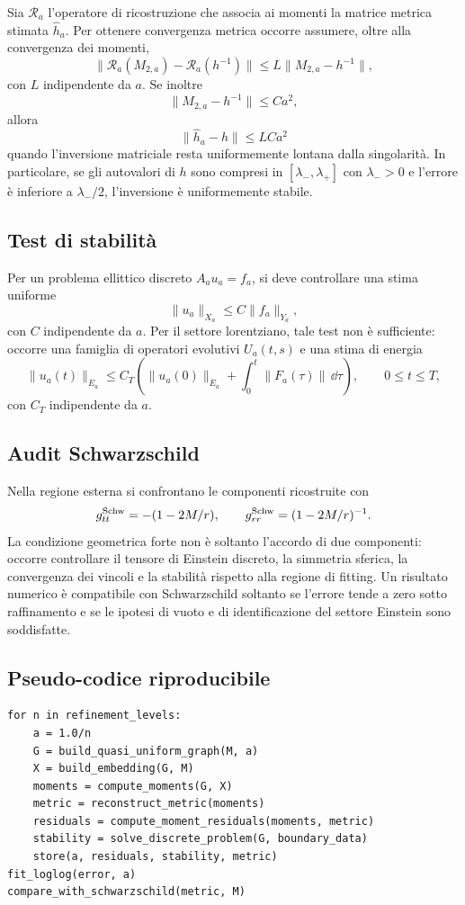 Sia $\mathcal R_a$ l'operatore di ricostruzione che associa ai momenti
la matrice metrica stimata $\widehat h_a$. Per ottenere convergenza
metrica occorre assumere, oltre alla convergenza dei momenti,
\[
\|\mathcal R_a(M_{2,a})-\mathcal R_a(h^{-1})\|
\leq L\|M_{2,a}-h^{-1}\|,
\]
con $L$ indipendente da $a$. Se inoltre
\[
\|M_{2,a}-h^{-1}\|\leq Ca^2,
\]
allora
\[
\|\widehat h_a-h\|\leq LCa^2
\]
quando l'inversione matriciale resta uniformemente lontana dalla
singolarità. In particolare, se gli autovalori di $h$ sono compresi in
$[\lambda_-,\lambda_+]$ con $\lambda_->0$ e l'errore è inferiore a
$\lambda_-/2$, l'inversione è uniformemente stabile.

\subsection{Test di stabilità}

Per un problema ellittico discreto $A_au_a=f_a$, si deve controllare
una stima uniforme
\[
\|u_a\|_{X_a}\leq C\|f_a\|_{Y_a},
\]
con $C$ indipendente da $a$. Per il settore lorentziano, tale test
non è sufficiente: occorre una famiglia di operatori evolutivi
$U_a(t,s)$ e una stima di energia
\[
\|u_a(t)\|_{E_a}\leq C_T\left(\|u_a(0)\|_{E_a}
+\int_0^t\|F_a(\tau)\|\,\dd\tau\right),
\qquad 0\leq t\leq T,
\]
con $C_T$ indipendente da $a$.

\subsection{Audit Schwarzschild}

Nella regione esterna si confrontano le componenti ricostruite con
\[
g_{tt}^{\rm Schw}=-(1-2M/r),
\qquad
g_{rr}^{\rm Schw}=(1-2M/r)^{-1}.
\]
La condizione geometrica forte non è soltanto l'accordo di due
componenti: occorre controllare il tensore di Einstein discreto,
la simmetria sferica, la convergenza dei vincoli e la stabilità rispetto
alla regione di fitting. Un risultato numerico è compatibile con
Schwarzschild soltanto se l'errore tende a zero sotto raffinamento e
se le ipotesi di vuoto e di identificazione del settore Einstein sono
soddisfatte.

\subsection{Pseudo-codice riproducibile}

\begin{verbatim}
for n in refinement_levels:
    a = 1.0/n
    G = build_quasi_uniform_graph(M, a)
    X = build_embedding(G, M)
    moments = compute_moments(G, X)
    metric = reconstruct_metric(moments)
    residuals = compute_moment_residuals(moments, metric)
    stability = solve_discrete_problem(G, boundary_data)
    store(a, residuals, stability, metric)
fit_loglog(error, a)
compare_with_schwarzschild(metric, M)
\end{verbatim}

